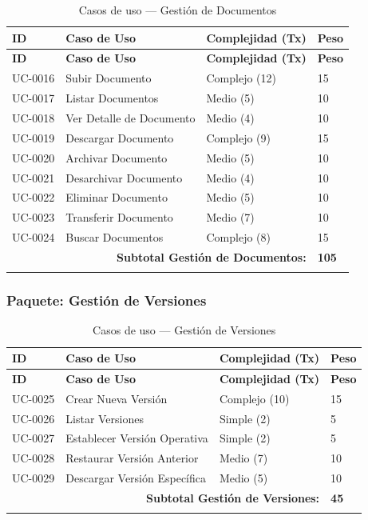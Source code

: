 \documentclass[11pt, a4paper]{article}
\begin{document}
\begin{longtable}{|p{1.8cm}|p{6.5cm}|p{3cm}|p{1.5cm}|}
\hline
\textbf{ID} & \textbf{Caso de Uso} & \textbf{Complejidad (Tx)} & \textbf{Peso} \\
\hline
\endfirsthead
\hline
\textbf{ID} & \textbf{Caso de Uso} & \textbf{Complejidad (Tx)} & \textbf{Peso} \\
\hline
\endhead
UC-0016 & Subir Documento & Complejo (12) & 15 \\
\hline
UC-0017 & Listar Documentos & Medio (5) & 10 \\
\hline
UC-0018 & Ver Detalle de Documento & Medio (4) & 10 \\
\hline
UC-0019 & Descargar Documento & Complejo (9) & 15 \\
\hline
UC-0020 & Archivar Documento & Medio (5) & 10 \\
\hline
UC-0021 & Desarchivar Documento & Medio (4) & 10 \\
\hline
UC-0022 & Eliminar Documento & Medio (5) & 10 \\
\hline
UC-0023 & Transferir Documento & Medio (7) & 10 \\
\hline
UC-0024 & Buscar Documentos & Complejo (8) & 15 \\
\hline
\multicolumn{3}{|r|}{\textbf{Subtotal Gestión de Documentos:}} & \textbf{105} \\
\hline
\caption{Casos de uso --- Gestión de Documentos}\label{tab:uc-documentos}
\end{longtable}

\subsubsection*{Paquete: Gestión de Versiones}

\begin{longtable}{|p{1.8cm}|p{6.5cm}|p{3cm}|p{1.5cm}|}
\hline
\textbf{ID} & \textbf{Caso de Uso} & \textbf{Complejidad (Tx)} & \textbf{Peso} \\
\hline
\endfirsthead
\hline
\textbf{ID} & \textbf{Caso de Uso} & \textbf{Complejidad (Tx)} & \textbf{Peso} \\
\hline
\endhead
UC-0025 & Crear Nueva Versión & Complejo (10) & 15 \\
\hline
UC-0026 & Listar Versiones & Simple (2) & 5 \\
\hline
UC-0027 & Establecer Versión Operativa & Simple (2) & 5 \\
\hline
UC-0028 & Restaurar Versión Anterior & Medio (7) & 10 \\
\hline
UC-0029 & Descargar Versión Específica & Medio (5) & 10 \\
\hline
\multicolumn{3}{|r|}{\textbf{Subtotal Gestión de Versiones:}} & \textbf{45} \\
\hline
\caption{Casos de uso --- Gestión de Versiones}\label{tab:uc-versiones}
\end{longtable}
\end{document}
